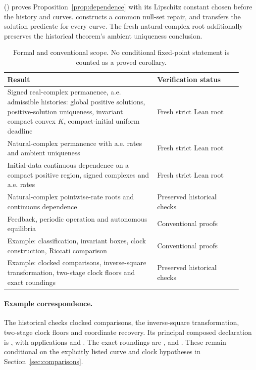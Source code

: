 \documentclass[11pt]{article}
\theoremstyle{definition}
\theoremstyle{remark}
\begin{document}
() proves Proposition~\ref{prop:dependence}
with its Lipschitz constant chosen before the history and curves.
 constructs a common null-set
repair, and  transfers the solution
predicate for every curve. The fresh natural-complex root
 additionally
preserves the historical theorem's ambient uniqueness conclusion.

\begin{table}[ht]
\centering\small
\renewcommand{\arraystretch}{1.15}
\begin{tabular}{p{0.60\linewidth}p{0.34\linewidth}}
\toprule
Result & Verification status\\
\midrule
Signed real-complex permanence, a.e. admissible histories: global positive
solutions, positive-solution uniqueness, invariant compact convex $K$,
compact-initial uniform deadline & Fresh strict Lean root\\
Natural-complex permanence with a.e. rates and ambient uniqueness
& Fresh strict Lean root\\
Initial-data continuous dependence on a compact positive region, signed
complexes and a.e. rates & Fresh strict Lean root\\
Natural-complex pointwise-rate roots and continuous dependence
& Preserved historical checks\\
Feedback, periodic operation and autonomous equilibria
& Conventional proofs\\
Example: classification, invariant boxes, clock construction, Riccati comparison
& Conventional proofs\\
Example: clocked comparisons, inverse-square transformation, two-stage clock
floors and exact roundings & Preserved historical checks\\
\bottomrule
\end{tabular}
\caption{Formal and conventional scope. No conditional fixed-point statement
is counted as a proved corollary.}
\label{tab:formal}
\end{table}

\paragraph{Example correspondence.}
The historical  checks clocked comparisons,
the inverse-square transformation, two-stage clock floors and coordinate recovery.
Its principal composed declaration is ,
with applications  and .
The exact roundings are ,
 and .
These remain conditional on the explicitly listed curve and clock hypotheses
in Section~\ref{sec:comparisons}.
\end{document}
